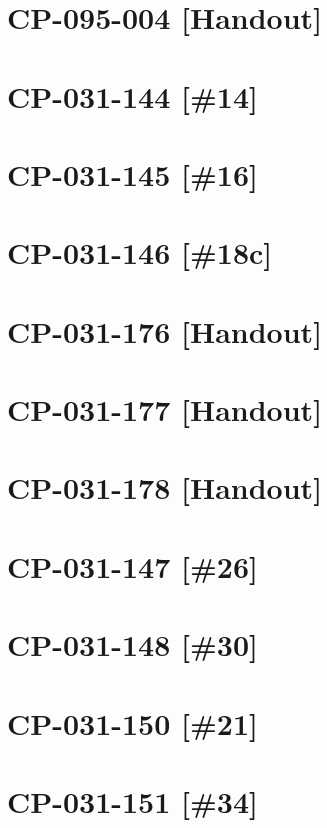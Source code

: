 \section{CP-095-004 [Handout]}\newpage

\setcounter{section}{0}

\section{CP-031-144 [\#14]}\newpage
\section{CP-031-145 [\#16]}\newpage	
\section{CP-031-146 [\#18c]}\newpage	
\section{CP-031-176 [Handout]}\newpage	
\section{CP-031-177 [Handout]}\newpage	
\section{CP-031-178 [Handout]}\newpage

\setcounter{section}{0}

\section{CP-031-147 [\#26]}\newpage	
\section{CP-031-148 [\#30]}\newpage	
\section{CP-031-150 [\#21]}\newpage
\section{CP-031-151 [\#34]}\newpage
